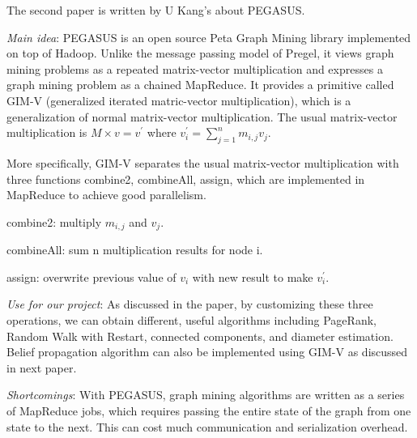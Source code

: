 The second paper is written by U Kang's about PEGASUS\cite{Kang:2009:PPG:1674659.1677058}.
\begin{itemize*}
\item {\em Main idea}: PEGASUS is an open source Peta Graph Mining library implemented on top of Hadoop. Unlike the message passing model of Pregel, it views graph mining problems as a repeated matrix-vector multiplication and expresses a graph mining problem as a chained MapReduce. It provides a primitive called GIM-V (generalized iterated matric-vector multiplication), which is a generalization of normal matrix-vector multiplication. The usual matrix-vector multiplication is $M \times v = v^{\prime}$ where $ v^{\prime}_{i} = \sum_{j=1}^{n} m_{i,j}v_{j}$.

More specifically, GIM-V separates the usual matrix-vector multiplication with three functions combine2, combineAll, assign, which are implemented in MapReduce to achieve good parallelism. 

\begin{itemize*}
\item combine2: multiply $m_{i,j}$ and $v_{j}$.
\item combineAll: sum n multiplication results for node i.
\item assign: overwrite previous value of $v_{i}$ with new result to make $v^{\prime}_{i}$.
\end{itemize*}

\item {\em Use for our project}: 
As discussed in the paper, by customizing these three operations, we can obtain different, useful algorithms including PageRank, Random Walk with Restart, connected components, and diameter estimation. Belief propagation algorithm can also be implemented using GIM-V as discussed in next paper.
\item {\em Shortcomings}:
With PEGASUS, graph mining algorithms are written as a series of MapReduce jobs, which requires passing the entire state of the graph from one state to the next. This can cost much communication and serialization overhead.
\end{itemize*}

